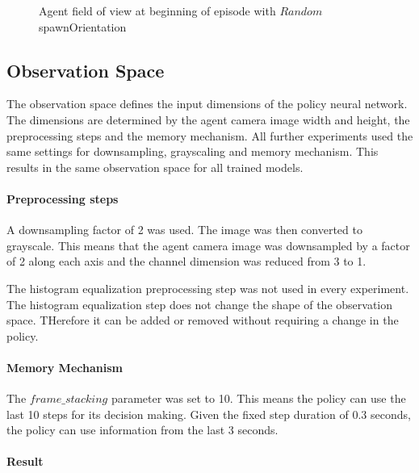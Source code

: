 \begin{figure}
    \centering
    \qquad
    \qquad
    \qquad
    \caption{Agent field of view at beginning of episode with $Random$ spawnOrientation}
    \label{fig:agent_field_of_view}
\end{figure}


\subsection{Observation Space}

The observation space defines the input dimensions of the policy neural network. The dimensions are determined by the agent camera image width and height, the preprocessing steps and the memory mechanism. All further experiments used the same settings for downsampling, grayscaling and memory mechanism. This results in the same observation space for all trained models.

\paragraph{Preprocessing steps}
A downsampling factor of 2 was used. The image was then converted to grayscale. This means that the agent camera image was downsampled by a factor of 2 along each axis and the channel dimension was reduced from 3 to 1.

The histogram equalization preprocessing step was not used in every experiment. The histogram equalization step does not change the shape of the observation space. THerefore it can be added or removed without requiring a change in the policy.

\paragraph{Memory Mechanism}
The $frame\_stacking$ parameter was set to 10. This means the policy can use the last 10 steps for its decision making. Given the fixed step duration of 0.3 seconds, the policy can use information from the last 3 seconds.

\paragraph{Result}

